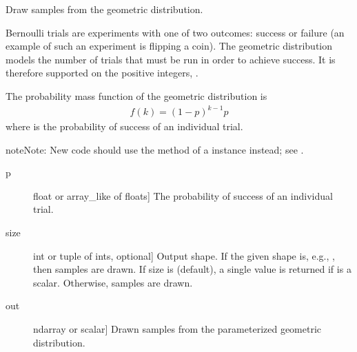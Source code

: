 \documentclass[letterpaper,10pt,english]{sphinxmanual}
\begin{document}
\begin{fulllineitems}
\label{\detokenize{infrapy.utils:infrapy.utils.ref2sac.geometric}}
Draw samples from the geometric distribution.

Bernoulli trials are experiments with one of two outcomes:
success or failure (an example of such an experiment is flipping
a coin).  The geometric distribution models the number of trials
that must be run in order to achieve success.  It is therefore
supported on the positive integers, .

The probability mass function of the geometric distribution is
\begin{equation*}
\begin{split}f(k) = (1 - p)^{k - 1} p\end{split}
\end{equation*}
where  is the probability of success of an individual trial.

\begin{sphinxadmonition}{note}{Note:}
New code should use the  method of a 
instance instead; see .
\end{sphinxadmonition}
\begin{description}
\item[{p}] \leavevmode{[}float or array\_like of floats{]}
The probability of success of an individual trial.

\item[{size}] \leavevmode{[}int or tuple of ints, optional{]}
Output shape.  If the given shape is, e.g., , then
 samples are drawn.  If size is  (default),
a single value is returned if  is a scalar.  Otherwise,
 samples are drawn.

\end{description}
\begin{description}
\item[{out}] \leavevmode{[}ndarray or scalar{]}
Drawn samples from the parameterized geometric distribution.

\end{description}


\end{fulllineitems}
\end{document}
